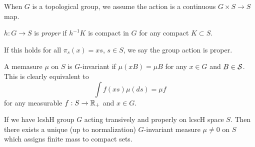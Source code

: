 When $G$ is a topological group, we assume the action is
a continuous $G \times S \to S$ map.

\begin{definition}
  $h : G \to S$ is \emph{proper} if $h^{-1} K$ is
  compact in $G$ for any compact $K \subset S$.

  If this holds for all $\pi_s(x) = x s$, $s \in S$,
  we say the group action is proper.
\end{definition}

\begin{definition}
  A memasure $\mu$ on $S$ is $G$-invariant if
  $\mu(xB) = \mu B$ for any $x \in G$
  and $B \in \mathcal{S}$. This is clearly equivalent to
  \[
    \int f(xs) \mu(ds) = \mu f
  \]
  for any measurable $f : S \to \mathbb{R}_+$ and $x \in G$.
\end{definition}

\begin{theorem}
  If we have lcshH group $G$ acting transively and properly on lcscH space $S$.
  Then there exists a unique (up to normalization) $G$-invariant
  measure $\mu \neq 0$ on $S$ which assigns finite mass to compact sets.
\end{theorem}

